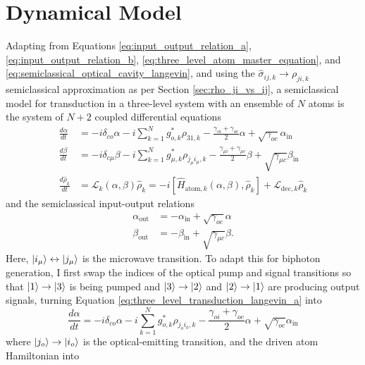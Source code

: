 \section{\label{sec:biphoton_dynamical_model}Dynamical Model}
Adapting from Equations \ref{eq:input_output_relation_a}, \ref{eq:input_output_relation_b}, \ref{eq:three_level_atom_master_equation}, and \ref{eq:semiclassical_optical_cavity_langevin}, and using the $\hat{\sigma}_{ij,k}\to\rho_{ji,k}$ semiclassical approximation as per Section \ref{sec:rho_ji_vs_ij}, a semiclassical model for transduction in a three-level system with an ensemble of $N$ atoms is the system of $N+2$ coupled differential equations
\begin{align}
    \frac{d\alpha}{dt} &= -i\delta_{co}\alpha -i\sum_{k=1}^{N} g_{o,k}^*\rho_{31,k} - \frac{\gamma_{oi}+\gamma_{oc}}{2}\alpha + \sqrt{\gamma_{oc}}\alpha_\text{in} \label{eq:three_level_transduction_langevin_a}\\
    \frac{d\beta}{dt} &= -i\delta_{c\mu}\beta -i\sum_{k=1}^{N} g_{\mu,k}^*\rho_{j_\mu i_\mu,k} - \frac{\gamma_{\mu i}+\gamma_{\mu c}}{2}\beta + \sqrt{\gamma_{\mu c}}\beta_\text{in}\\
    \frac{d\hat{\rho}_k}{dt} &= \mathcal{L}_k(\alpha, \beta)\hat{\rho}_k = -i[\hat{H}_{\text{atom},k}(\alpha, \beta), \hat{\rho}_k] + \mathcal{L}_{\text{dec},k}\hat{\rho}_k
\end{align}
and the semiclassical input-output relations
\begin{align}
    \alpha_\text{out} &= -\alpha_\text{in} + \sqrt{\gamma_{oc}}\alpha\\
    \beta_\text{out} &= -\beta_\text{in} + \sqrt{\gamma_{\mu c}}\beta.
\end{align}
Here, $\left|i_\mu\right\rangle\leftrightarrow\left|j_\mu\right\rangle$ is the microwave transition. To adapt this for biphoton generation, I first swap the indices of the optical pump and signal transitions so that $\left|1\right\rangle\to\left|3\right\rangle$ is being pumped and $\left|3\right\rangle\to\left|2\right\rangle$ and $\left|2\right\rangle\to\left|1\right\rangle$ are producing output signals, turning Equation \ref{eq:three_level_transduction_langevin_a} into
\begin{equation}
    \frac{d\alpha}{dt} = -i\delta_{co}\alpha -i\sum_{k=1}^{N} g_{o,k}^*\rho_{j_o i_o,k} - \frac{\gamma_{oi}+\gamma_{oc}}{2}\alpha + \sqrt{\gamma_{oc}}\alpha_\text{in}
\end{equation}
where $\left|j_o\right\rangle\to\left|i_o\right\rangle$ is the optical-emitting transition, and the driven atom Hamiltonian into
